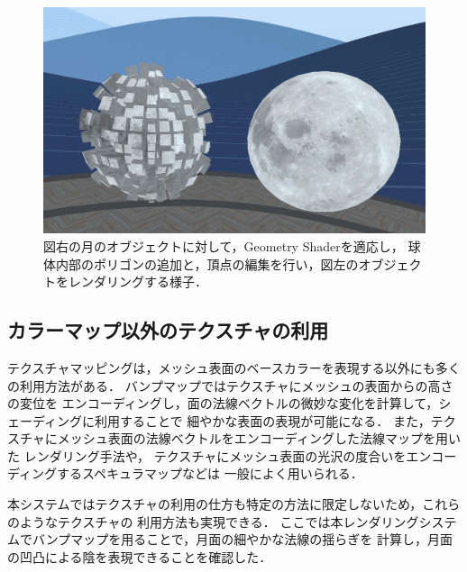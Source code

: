 \begin{figure}[htbp]
  \centering
  \includegraphics[keepaspectratio, width=0.7\linewidth]{figures/geometry-shader.jpg}
  \caption{
    図右の月のオブジェクトに対して，Geometry Shaderを適応し，
    球体内部のポリゴンの追加と，頂点の編集を行い，図左のオブジェクトをレンダリングする様子．
  }
  \label{fig:geometry-shader}
\end{figure}

\subsection{カラーマップ以外のテクスチャの利用}

テクスチャマッピングは，メッシュ表面のベースカラーを表現する以外にも多くの利用方法がある．
バンプマップ\cite{bump-mapping}ではテクスチャにメッシュの表面からの高さの変位を
エンコーディングし，面の法線ベクトルの微妙な変化を計算して，シェーディングに利用することで
細やかな表面の表現が可能になる．
また，テクスチャにメッシュ表面の法線ベクトルをエンコーディングした法線マップを用いた
レンダリング手法\cite{normal-map}や，
テクスチャにメッシュ表面の光沢の度合いをエンコーディングするスペキュラマップなどは
一般によく用いられる．

本システムではテクスチャの利用の仕方も特定の方法に限定しないため，これらのようなテクスチャの
利用方法も実現できる．
ここでは本レンダリングシステムでバンプマップを用ることで，月面の細やかな法線の揺らぎを
計算し，月面の凹凸による陰を表現できることを確認した．


